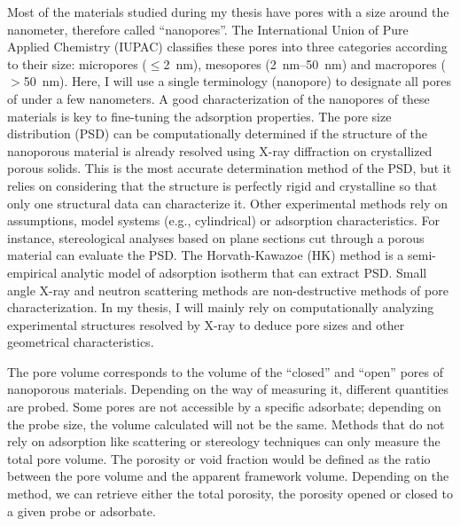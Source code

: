 \documentclass[main.tex]{subfiles}
\begin{document}
Most of the materials studied during my thesis have pores with a size around the nanometer, therefore called ``nanopores''. The International Union of Pure Applied Chemistry (IUPAC) classifies these pores into three categories according to their size: micropores ($\leq$\SI{2}{\nano\meter}), mesopores (\SI{2}{\nano\meter}--\SI{50}{\nano\meter}) and macropores ($>$\SI{50}{\nano\meter}).\autocite{Sing_1985} Here, I will use a single terminology (nanopore) to designate all pores of under a few nanometers. A good characterization of the nanopores of these materials is key to fine-tuning the adsorption properties.\autocite{Yan_2020} The pore size distribution (PSD) can be computationally determined if the structure of the nanoporous material is already resolved using X-ray diffraction on crystallized porous solids. This is the most accurate determination method of the PSD, but it relies on considering that the structure is perfectly rigid and crystalline so that only one structural data can characterize it. Other experimental methods rely on assumptions, model systems (e.g., cylindrical) or adsorption characteristics. For instance, stereological analyses based on plane sections cut through a porous material can evaluate the PSD.\autocite{Haynes_1973} The Horvath-Kawazoe (HK) method is a semi-empirical analytic model of adsorption isotherm that can extract PSD. Small angle X-ray and neutron scattering methods are non-destructive methods of pore characterization.\autocite{Radlinski_2004} In my thesis, I will mainly rely on computationally analyzing experimental structures resolved by X-ray to deduce pore sizes and other geometrical characteristics. 

The pore volume corresponds to the volume of the ``closed'' and ``open'' pores of nanoporous materials. Depending on the way of measuring it, different quantities are probed. Some pores are not accessible by a specific adsorbate; depending on the probe size, the volume calculated will not be the same. Methods that do not rely on adsorption like scattering or stereology techniques can only measure the total pore volume. The porosity or void fraction would be defined as the ratio between the pore volume and the apparent framework volume. Depending on the method, we can retrieve either the total porosity, the porosity opened or closed to a given probe or adsorbate. 
\end{document}
